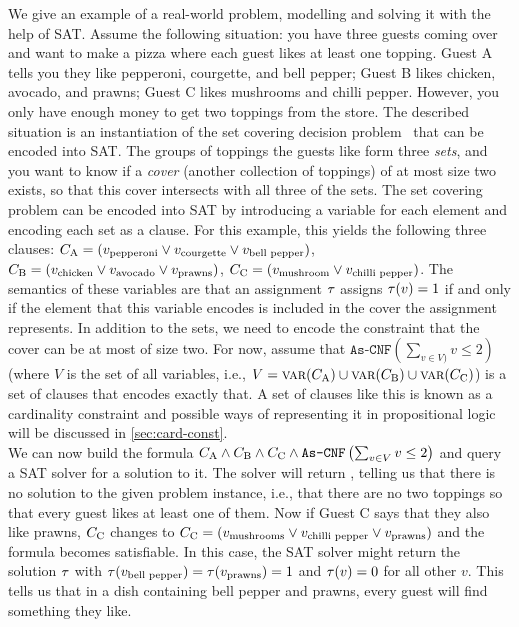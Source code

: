 \begin{example}\label{ex:sat-modelling}
  We give an example of a real-world problem, modelling and solving it with the help of SAT.
  Assume the following situation:
  you have three guests coming over and want to make a pizza where each guest likes at least one topping.
  Guest A tells you they like pepperoni, courgette, and bell pepper;
  Guest B likes chicken, avocado, and prawns;
  Guest C likes mushrooms and chilli pepper.
  However, you only have enough money to get two toppings from the store.
  The described situation is an instantiation of the set covering decision problem~\autocite{DBLP:conf/coco/Karp72} that can be encoded into SAT.
  The groups of toppings the guests like form three \emph{sets}, and you want to know if a \emph{cover} (another collection of toppings) of at most size two exists, so that this cover intersects with all three of the sets.
  The set covering problem can be encoded into SAT by introducing a variable for each element and encoding each set as a clause.
  For this example, this yields the following three clauses: $C_\text{A} = (v_\text{pepperoni} \lor v_\text{courgette} \lor v_\text{bell pepper})$, $C_\text{B} = (v_\text{chicken} \lor v_\text{avocado} \lor v_\text{prawns})$, $C_\text{C} = (v_\text{mushroom} \lor v_\text{chilli pepper})$.
  The semantics of these variables are that an assignment $\tau$ assigns $\tau(v)=1$ if and only if the element that this variable encodes is included in the cover the assignment represents.
  In addition to the sets, we need to encode the constraint that the cover can be at most of size two.
  For now, assume that $\texttt{As-CNF}\left(\sum_{v \in V)} v \le 2\right)$ (where $V$ is the set of all variables, i.e., $V = \textsc{var}(C_\text{A}) \cup \textsc{var}(C_\text{B}) \cup \textsc{var}(C_\text{C})$) is a set of clauses that encodes exactly that.
  A set of clauses like this is known as a cardinality constraint and possible ways of representing it in propositional logic will be discussed in \cref{sec:card-const}.\\
  We can now build the formula $C_\text{A} \allowbreak \land C_\text{B} \allowbreak \land C_\text{C} \allowbreak \land \texttt{As-CNF}\left(\sum_{v \in V} v \le 2\right)$ and query a SAT solver for a solution to it.
  The solver will return \unsat{}, telling us that there is no solution to the given problem instance, i.e., that there are no two toppings so that every guest likes at least one of them.
  Now if Guest C says that they also like prawns, $C_\text{C}$ changes to $C_\text{C} = (v_\text{mushrooms} \lor v_\text{chilli pepper} \lor v_\text{prawns})$ and the formula becomes satisfiable.
  In this case, the SAT solver might return the solution $\tau$ with $\tau(v_\text{bell pepper}) = \tau(v_\text{prawns}) = 1$ and $\tau(v) = 0$ for all other $v$.
  This tells us that in a dish containing bell pepper and prawns, every guest will find something they like.
\end{example}

